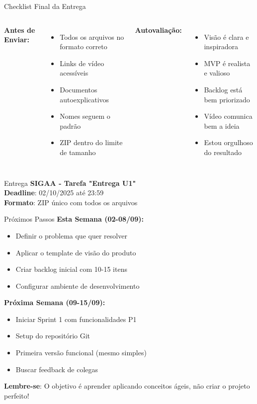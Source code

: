 \documentclass[10pt]{beamer}
\begin{document}
\begin{frame}{Checklist Final da Entrega}
\begin{columns}[t]
\textbf{Antes de Enviar:}
\begin{itemize}
    \item Todos os arquivos no formato correto
    \item Links de vídeo acessíveis
    \item Documentos autoexplicativos
    \item Nomes seguem o padrão
    \item ZIP dentro do limite de tamanho
\end{itemize}

\textbf{Autovaliação:}
\begin{itemize}
    \item Visão é clara e inspiradora
    \item MVP é realista e valioso
    \item Backlog está bem priorizado
    \item Vídeo comunica bem a ideia
    \item Estou orgulhoso do resultado
\end{itemize}
\end{columns}

\vspace{0.5cm}
\begin{block}{Entrega}
\textbf{SIGAA - Tarefa "Entrega U1"}\\
\textbf{Deadline}: 02/10/2025 até 23:59\\
\textbf{Formato}: ZIP único com todos os arquivos
\end{block}
\end{frame}

\begin{frame}{Próximos Passos}
\textbf{Esta Semana (02-08/09):}
\begin{itemize}
    \item Definir o problema que quer resolver
    \item Aplicar o template de visão do produto
    \item Criar backlog inicial com 10-15 itens
    \item Configurar ambiente de desenvolvimento
\end{itemize}

\vspace{0.3cm}
\textbf{Próxima Semana (09-15/09):}
\begin{itemize}
    \item Iniciar Sprint 1 com funcionalidades P1
    \item Setup do repositório Git
    \item Primeira versão funcional (mesmo simples)
    \item Buscar feedback de colegas
\end{itemize}

\vspace{0.3cm}
\textbf{Lembre-se}: O objetivo é aprender aplicando conceitos ágeis, não criar o projeto perfeito!
\end{frame}
\end{document}
